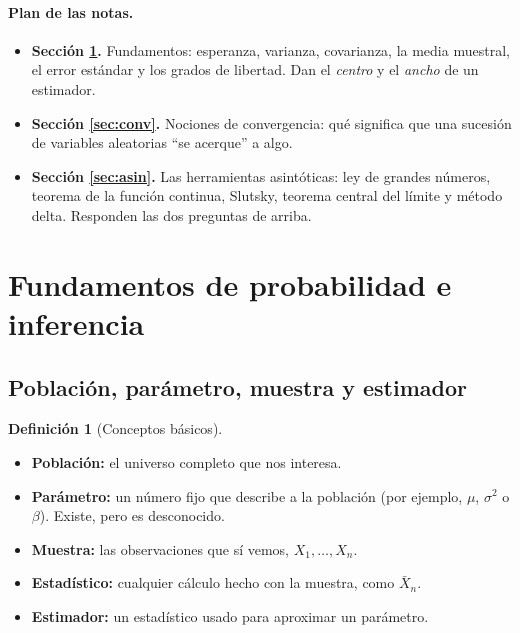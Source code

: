 \documentclass[11pt,a4paper]{article}
\theoremstyle{plain}
\theoremstyle{definition}
\newtheorem{definicion}[teorema]{Definición}
\theoremstyle{remark}
\begin{document}
\paragraph{Plan de las notas.}
\begin{itemize}
  \item \textbf{Sección \ref{sec:fund}.} Fundamentos: esperanza, varianza, covarianza, la media
        muestral, el error estándar y los grados de libertad. Dan el \emph{centro} y el
        \emph{ancho} de un estimador.
  \item \textbf{Sección \ref{sec:conv}.} Nociones de convergencia: qué significa que una sucesión
        de variables aleatorias ``se acerque'' a algo.
  \item \textbf{Sección \ref{sec:asin}.} Las herramientas asintóticas: ley de grandes números,
        teorema de la función continua, Slutsky, teorema central del límite y método delta.
        Responden las dos preguntas de arriba.
\end{itemize}

\section{Fundamentos de probabilidad e inferencia}\label{sec:fund}

\subsection{Población, parámetro, muestra y estimador}

\begin{definicion}[Conceptos básicos]\label{def:basicos}\leavevmode
\begin{itemize}
  \item \textbf{Población:} el universo completo que nos interesa.
  \item \textbf{Parámetro:} un número fijo que describe a la población (por ejemplo, $\mu$,
        $\sigma^2$ o $\beta$). Existe, pero es desconocido.
  \item \textbf{Muestra:} las observaciones que sí vemos, $X_1,\dots,X_n$.
  \item \textbf{Estadístico:} cualquier cálculo hecho con la muestra, como $\bar X_n$.
  \item \textbf{Estimador:} un estadístico usado para aproximar un parámetro.
\end{itemize}
\end{definicion}
\end{document}
